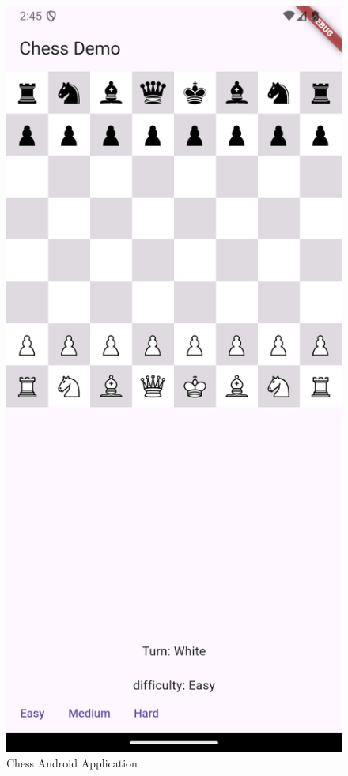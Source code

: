 \documentclass[11pt,journal]{IEEEtran}
\begin{document}
\begin{figure}[ht]
  \includegraphics[width=\linewidth]{chessApp2.png}
  \caption{Chess Android Application}
  \label{chessapp}
\end{figure}
\end{document}

